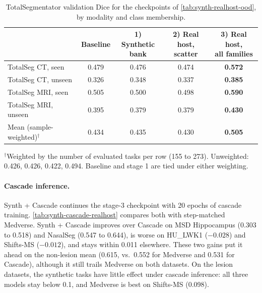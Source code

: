 \begin{table}[t]
  \centering
  \small
  \caption{TotalSegmentator validation Dice for the checkpoints of
  \autoref{tab:synth-realhost-ood}, by modality and class membership.}
  \label{tab:synth-realhost-indist}
  \begin{tabular}{@{}lcccc@{}}
    \toprule
     & Baseline & \makecell{1) Synthetic\\bank} & \makecell{2) Real host,\\scatter} & \makecell{3) Real host,\\all families} \\
    \midrule
    TotalSeg CT, seen      & 0.479 & 0.476 & 0.474 & \textbf{0.572} \\
    TotalSeg CT, unseen    & 0.326 & 0.348 & 0.337 & \textbf{0.385} \\
    TotalSeg MRI, seen     & 0.505 & 0.500 & 0.498 & \textbf{0.590} \\
    TotalSeg MRI, unseen   & 0.395 & 0.379 & 0.379 & \textbf{0.430} \\
    \midrule
    Mean (sample-weighted)$^{\dagger}$ & 0.434 & 0.435 & 0.430 & \textbf{0.505} \\
    \bottomrule
  \end{tabular}
  \par\vspace{0.5em}
  \raggedright\footnotesize
  $^{\dagger}$Weighted by the number of evaluated tasks per row (155 to 273).
  Unweighted: 0.426, 0.426, 0.422, 0.494. Baseline and stage 1 are tied under
  either weighting.
\end{table}

\paragraph{Cascade inference.}
Synth + Cascade continues the stage-3 checkpoint with 20 epochs of cascade
training.
\autoref{tab:synth-cascade-realhost} compares both with step-matched Medverse.
Synth + Cascade improves over Cascade on MSD Hippocampus (0.303 to 0.518) and
NasalSeg (0.547 to 0.644), is worse on HU\_LWK1 ($-0.028$) and Shifts-MS
($-0.012$), and stays within 0.011 elsewhere. These two gains put it ahead on
the non-lesion mean (0.615, vs.\ 0.552 for Medverse and 0.531 for Cascade),
although it still trails Medverse on both datasets. On the lesion datasets,
the synthetic tasks have little effect under cascade inference: all three
models stay below 0.1, and Medverse is best on Shifts-MS (0.098).

